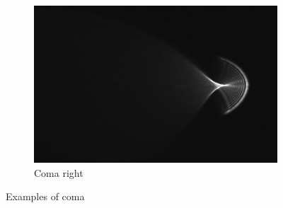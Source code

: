 \documentclass[a4paper,12pt]{article}
\begin{document}
\begin{figure}[H]
        \begin{subfigure}{0.3\textwidth}
                \includegraphics[width=\textwidth]{comahoyre2}
                \caption{Coma right}
                \label{fig:comahoyre}
        \end{subfigure}
        \caption{Examples of coma}\label{fig:Coma1}
\end{figure}
\end{document}
